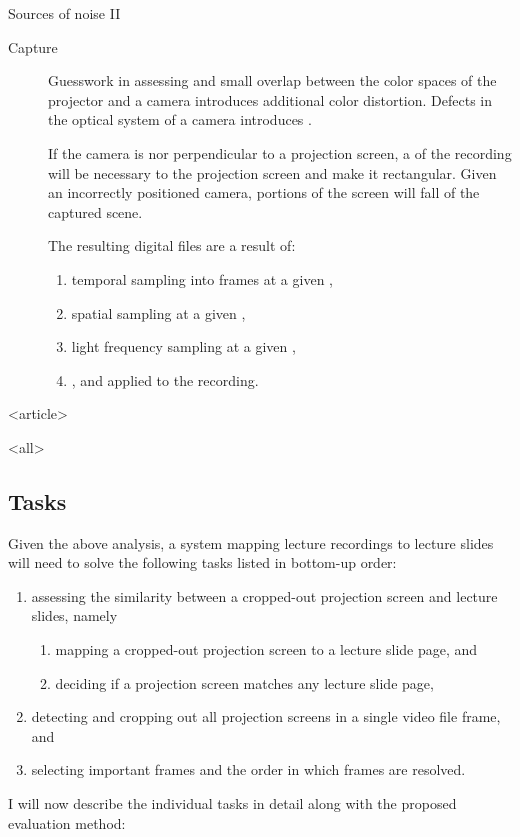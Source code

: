\begin{frame}{Sources of noise II}
\begin{description}
\item[Capture]
  Guesswork in assessing  and small overlap between the
  color spaces of the projector and a camera introduces additional color
  distortion. Defects in the optical system of a camera introduces
  .\pause
    
  If the camera is nor perpendicular to a projection screen, a
   of the recording will be necessary to
   the projection screen and make it rectangular.
  Given an incorrectly positioned camera, portions of the screen
  will fall  of the captured scene.\pause

  The resulting digital files are a result of:\pause
  \begin{enumerate}
  \item temporal sampling into frames at a given ,\pause
  \item spatial sampling at a given ,\pause
  \item light frequency sampling at a given ,\pause
  \item {}, and \pause
    \pause applied to the recording.
  \end{enumerate}
\end{description}
\end{frame}

\mode
<article>


\mode
<all>{%
\subsection{Tasks}
\label{sec:tasks}}
Given the above analysis, a system mapping lecture recordings to lecture slides
will need to solve the following tasks listed in bottom-up order:
\begin{enumerate}
  \item assessing the similarity between a cropped-out projection screen and
    lecture slides, namely
    \begin{enumerate}
      \item mapping a cropped-out projection screen to a lecture slide page, and
      \item deciding if a projection screen matches any lecture slide page,
    \end{enumerate}
  \item detecting and cropping out all projection screens in a single video
    file frame, and
  \item selecting important frames and the order in which frames are resolved.
\end{enumerate}
I will now describe the individual tasks in detail along with the proposed
evaluation method:

